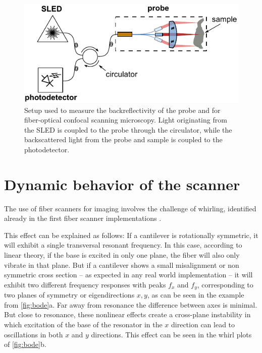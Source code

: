 \begin{itemize}
\end{itemize}

\begin{figure}[h!]\centering \includegraphics[width=12cm]{figures/50_Measurements/conf/setup/confSetup.pdf}
      \caption{Setup used to measure the backreflectivity of the probe and for fiber-optical confocal scanning microscopy. Light originating from the SLED is coupled to the probe through the circulator, while the backscattered light from the probe and sample is coupled to the photodetector.}
      \label{fig:confSetup}
\end{figure}

\section{Dynamic behavior of the scanner}
\label{sec:whirling}
The use of fiber scanners for imaging involves the challenge of whirling, identified already in the first fiber scanner implementations \cite{Seibel2001}.

This effect can be explained as follows: If a cantilever is rotationally symmetric, it will exhibit a single transversal resonant frequency. In this case, according to linear theory, if the base is excited in only one plane, the fiber will also only vibrate in that plane. But if a cantilever shows a small misalignment or non symmetric cross section -- as expected in any real world implementation -- it will exhibit two different frequency responses with peaks $f_x$ and $f_y$, corresponding to two planes of symmetry or eigendirections $x,y$, as can be seen in the example from \autoref{fig:bode}a. Far away from resonance the difference between axes is minimal. But close to resonance, these nonlinear effects create a cross-plane instability in which excitation of the base of the resonator in the $x$ direction can lead to oscillations in both $x$ and $y$ directions. This effect can be seen in the whirl plots of \autoref{fig:bode}b. 

